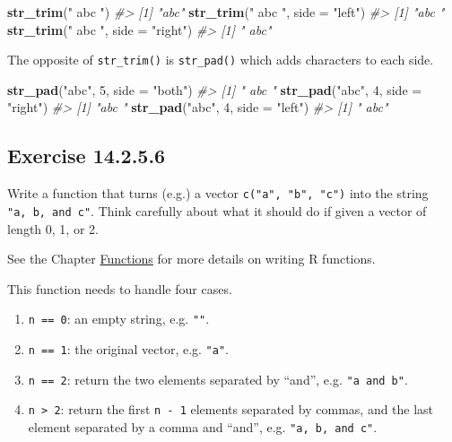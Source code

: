 \documentclass[]{book}
\newenvironment{Shaded}{\begin{snugshade}}{\end{snugshade}}
\newcommand{\CommentTok}[1]{\textcolor[rgb]{0.56,0.35,0.01}{\textit{#1}}}
\newcommand{\DataTypeTok}[1]{\textcolor[rgb]{0.13,0.29,0.53}{#1}}
\newcommand{\DecValTok}[1]{\textcolor[rgb]{0.00,0.00,0.81}{#1}}
\newcommand{\KeywordTok}[1]{\textcolor[rgb]{0.13,0.29,0.53}{\textbf{#1}}}
\newcommand{\NormalTok}[1]{#1}
\newcommand{\StringTok}[1]{\textcolor[rgb]{0.31,0.60,0.02}{#1}}
\providecommand{\tightlist}{%
  \setlength{\itemsep}{0pt}\setlength{\parskip}{0pt}}
\theoremstyle{plain}
\theoremstyle{remark}
\begin{document}
\begin{Shaded}
\begin{Highlighting}[]
\KeywordTok{str_trim}\NormalTok{(}\StringTok{" abc "}\NormalTok{)}
\CommentTok{#> [1] "abc"}
\KeywordTok{str_trim}\NormalTok{(}\StringTok{" abc "}\NormalTok{, }\DataTypeTok{side =} \StringTok{"left"}\NormalTok{)}
\CommentTok{#> [1] "abc "}
\KeywordTok{str_trim}\NormalTok{(}\StringTok{" abc "}\NormalTok{, }\DataTypeTok{side =} \StringTok{"right"}\NormalTok{)}
\CommentTok{#> [1] " abc"}
\end{Highlighting}
\end{Shaded}

The opposite of \texttt{str\_trim()} is \texttt{str\_pad()} which adds characters to each side.

\begin{Shaded}
\begin{Highlighting}[]
\KeywordTok{str_pad}\NormalTok{(}\StringTok{"abc"}\NormalTok{, }\DecValTok{5}\NormalTok{, }\DataTypeTok{side =} \StringTok{"both"}\NormalTok{)}
\CommentTok{#> [1] " abc "}
\KeywordTok{str_pad}\NormalTok{(}\StringTok{"abc"}\NormalTok{, }\DecValTok{4}\NormalTok{, }\DataTypeTok{side =} \StringTok{"right"}\NormalTok{)}
\CommentTok{#> [1] "abc "}
\KeywordTok{str_pad}\NormalTok{(}\StringTok{"abc"}\NormalTok{, }\DecValTok{4}\NormalTok{, }\DataTypeTok{side =} \StringTok{"left"}\NormalTok{)}
\CommentTok{#> [1] " abc"}
\end{Highlighting}
\end{Shaded}

\hypertarget{exercise-14.2.5.6}{%
\subsection*{\texorpdfstring{Exercise {14.2.5.6}}{Exercise 14.2.5.6}}\label{exercise-14.2.5.6}}

Write a function that turns (e.g.) a vector \texttt{c("a",\ "b",\ "c")} into the string \texttt{"a,\ b,\ and\ c"}. Think carefully about what it should do if given a vector of length 0, 1, or 2.

See the Chapter \protect\hyperlink{functions}{Functions} for more details on writing R functions.

This function needs to handle four cases.

\begin{enumerate}
\def\labelenumi{\arabic{enumi}.}
\tightlist
\item
  \texttt{n\ ==\ 0}: an empty string, e.g. \texttt{""}.
\item
  \texttt{n\ ==\ 1}: the original vector, e.g. \texttt{"a"}.
\item
  \texttt{n\ ==\ 2}: return the two elements separated by ``and'', e.g. \texttt{"a\ and\ b"}.
\item
  \texttt{n\ \textgreater{}\ 2}: return the first \texttt{n\ -\ 1} elements separated by commas, and the last element separated by a comma and ``and'', e.g. \texttt{"a,\ b,\ and\ c"}.
\end{enumerate}
\end{document}
